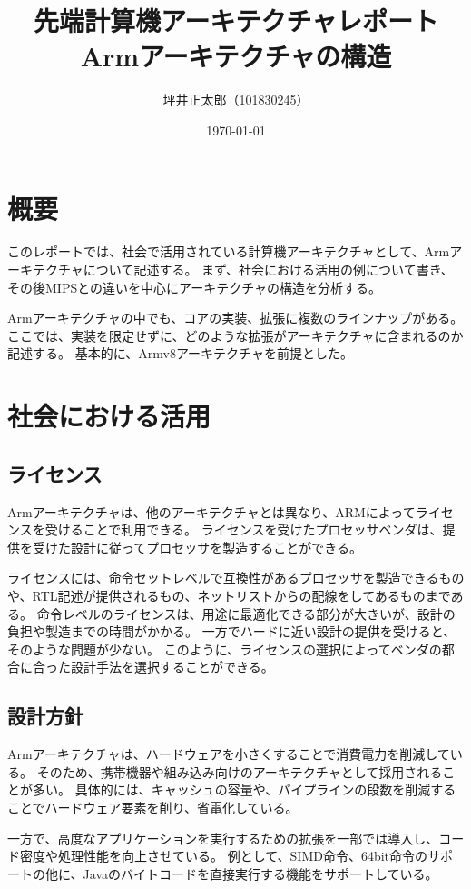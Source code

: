 \documentclass[a4paper,10pt]{jsarticle}
\begin{document}
\title{先端計算機アーキテクチャレポート\\
  Armアーキテクチャの構造}
\author{坪井正太郎（101830245）}
\date{\today}
\maketitle
\section{概要}
このレポートでは、社会で活用されている計算機アーキテクチャとして、Armアーキテクチャについて記述する。
まず、社会における活用の例について書き、その後MIPSとの違いを中心にアーキテクチャの構造を分析する。

Armアーキテクチャの中でも、コアの実装、拡張に複数のラインナップがある。
ここでは、実装を限定せずに、どのような拡張がアーキテクチャに含まれるのか記述する。
基本的に、Armv8アーキテクチャを前提とした。

\section{社会における活用}
\subsection{ライセンス}
Armアーキテクチャは、他のアーキテクチャとは異なり、ARMによってライセンスを受けることで利用できる。
ライセンスを受けたプロセッサベンダは、提供を受けた設計に従ってプロセッサを製造することができる。

ライセンスには、命令セットレベルで互換性があるプロセッサを製造できるものや、RTL記述が提供されるもの、ネットリストからの配線をしてあるものまである。
命令レベルのライセンスは、用途に最適化できる部分が大きいが、設計の負担や製造までの時間がかかる。
一方でハードに近い設計の提供を受けると、そのような問題が少ない。
このように、ライセンスの選択によってベンダの都合に合った設計手法を選択することができる。

\subsection{設計方針}
Armアーキテクチャは、ハードウェアを小さくすることで消費電力を削減している。
そのため、携帯機器や組み込み向けのアーキテクチャとして採用されることが多い。
具体的には、キャッシュの容量や、パイプラインの段数を削減することでハードウェア要素を削り、省電化している。

一方で、高度なアプリケーションを実行するための拡張を一部では導入し、コード密度や処理性能を向上させている。
例として、SIMD命令、64bit命令のサポートの他に、Javaのバイトコードを直接実行する機能をサポートしている。
\end{document}
